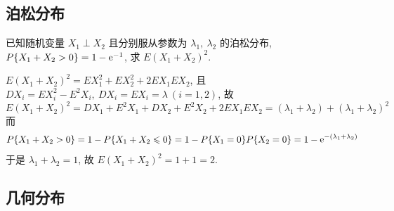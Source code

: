 \subsection{泊松分布}

\begin{example}
    已知随机变量 $X_1 \perp  X_2$ 且分别服从参数为 $\lambda_1,~\lambda_2$ 的泊松分布, $P\qty{X_1+X_2>0}=1-\mathrm{e} ^{-1}$, 求 $E(X_1+X_2)^2$.
\end{example}
\begin{solution}
    $E(X_1+X_2)^2=EX_1^2+EX_2^2+2EX_1EX_2$, 且 $DX_i=EX_i^2-E^2X_i,~DX_i=EX_i=\lambda~(i=1,2)$, 故 
    $$
    E(X_1+X_2)^2=DX_1+E^2X_1+DX_2+E^2X_2+2EX_1EX_2=(\lambda_1+\lambda_2)+(\lambda_1+\lambda_2)^2
    $$
    而 $$
    P\qty{X_1+X_2>0}=1-P\qty{X_1+X_2\leqslant 0}=1-P\qty{X_1=0}P\qty{X_2=0}=1-\mathrm{e} ^{-(\lambda_1+\lambda_2)}
    $$
    于是 $\lambda_1+\lambda_2=1$, 故 $E(X_1+X_2)^2=1+1=2.$
\end{solution}

% 
% 

\subsection{几何分布}

